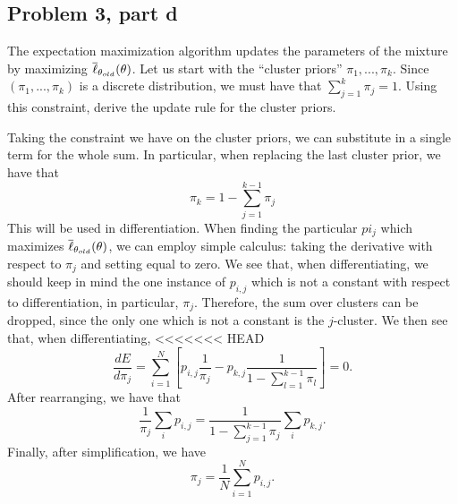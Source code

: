 \subsection{Problem 3, part d}
The expectation maximization algorithm updates the parameters of the mixture by maximizing $\overline{\ell}_{\theta_{old}}(\theta)$. Let us start with the ``cluster priors'' $\pi_1, ..., \pi_k.$ Since $(\pi_1, ..., \pi_k)$ is a discrete distribution, we must have that $\sum_{j = 1}^k \pi_j = 1$. Using this constraint, derive the update rule for the cluster priors. 
\partbreak
\begin{solution}

    Taking the constraint we have on the cluster priors, we can substitute in a single term for the whole sum. In particular, when replacing the last cluster prior, we have that 
    \[\pi_k = 1 - \sum_{j = 1}^{k-1} \pi_j\]
    This will be used in differentiation. When finding the particular $pi_j$ which maximizes $\overline{\ell}_{\theta_{old}}(\theta)$, we can employ simple calculus: taking the derivative with respect to $\pi_j$ and setting equal to zero. We see that, when differentiating, we should keep in mind the one instance of $p_{i, j}$ which is not a constant with respect to differentiation, in particular, $\pi_j$. Therefore, the sum over clusters can be dropped, since the only one which is not a constant is the $j$-cluster. We then see that, when differentiating, 
<<<<<<< HEAD
    \[\frac{d E}{d\pi_j} = \sum_{i = 1}^N \left[p_{i, j}\frac{1}{\pi_j} - p_{k, j}\frac{1}{1 - \sum_{l = 1}^{k-1} \pi_l}\right] = 0.\]
    After rearranging, we have that
    \[\frac{1}{\pi_j}\sum_i p_{i, j} = \frac{1}{1 - \sum_{j = 1}^{k-1} \pi_j}\sum_i p_{k, j}. \]
    Finally, after simplification, we have
    \[\pi_j = \frac{1}{N}\sum_{i = 1}^N p_{i, j}.\]
    
\end{solution}


\newpage

